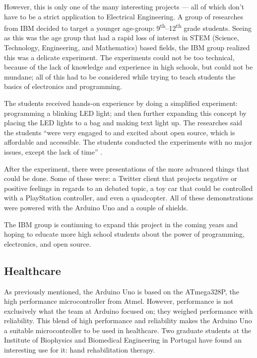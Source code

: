 \documentclass[11pt,letterpaper,twocolumn]{article}
\begin{document}
However, this is only one of the many interesting projects --- all of which don't have to be a strict application to Electrical Engineering. A group of researches from IBM decided to target a younger age-group: \num{9}\textsuperscript{th}--\num{12}\textsuperscript{th} grade students. Seeing as this was the age group that had a rapid loss of interest in STEM (Science, Technology, Engineering, and Mathematics) based fields, the IBM group realized this was a delicate experiment. The experiments could not be too technical, because of the lack of knowledge and experience in high schools, but could not be mundane; all of this had to be considered while trying to teach students the basics of electronics and programming.

The students received hands-on experience by doing a simplified experiment: programming a blinking LED light; and then further expanding this concept by placing the LED lights to a bag and making text light up. The researches said the students ``were very engaged to and excited about open source, which is affordable and accessible. The students conducted the experiments with no major issues, except the lack of time'' \cite{students}.

After the experiment, there were presentations of the more advanced things that could be done. Some of these were: a Twitter client that projects negative or positive feelings in regards to an debated topic, a toy car that could be controlled with a PlayStation controller, and even a quadcopter. All of these demonstrations were powered with the Arduino Uno and a couple of shields.

The IBM group is continuing to expand this project in the coming years and hoping to educate more high school students about the power of programming, electronics, and open source.

\subsection{Healthcare}
As previously mentioned, the Arduino Uno is based on the ATmega328P, the high performance microcontroller from Atmel. However, performance is not exclusively what the team at Arduino focused on; they weighed performance with reliability. This blend of high performance and reliability makes the Arduino Uno a suitable microcontroller to be used in healthcare. Two graduate students at the Institute of Biophysics and Biomedical Engineering in Portugal have found an interesting use for it: hand rehabilitation therapy.
\end{document}
